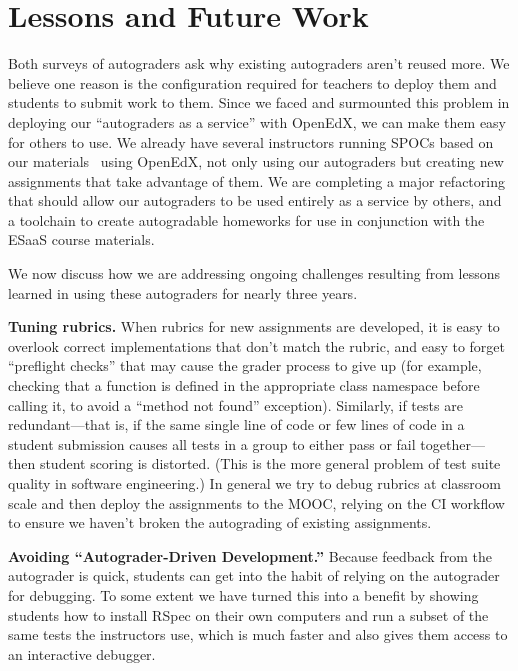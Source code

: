 \section{Lessons and Future Work}

Both  surveys of autograders ask why existing autograders aren't reused more.
We believe one reason is the configuration required for teachers to deploy them and
students to submit work to them.  Since we
faced and surmounted this problem in deploying our ``autograders as a
service'' with OpenEdX, we can make them easy for others to use.
We already have several instructors running SPOCs based on our
materials~\cite{moocs-spocs-TR} using OpenEdX, not only using our
autograders but creating new assignments that take advantage of them.
We are completing a major refactoring that should allow our autograders
to be used entirely as a service by others, and a toolchain to create
autogradable homeworks for use in conjunction with the ESaaS course
materials. 

We now discuss how we are addressing ongoing
challenges resulting from lessons learned in using these autograders for
nearly three years.

\textbf{Tuning rubrics.}
When rubrics for new assignments are developed, it is easy to overlook
correct implementations that don't match the rubric, and easy to forget
``preflight checks'' that may cause the grader process to give up (for
example, checking that a function is defined in the appropriate class
namespace before calling it, to avoid a ``method not found''
exception).  Similarly, if tests are
redundant---that is, if the same single line of code or few lines of
code in a student submission causes all tests in a group to either pass
or fail together---then student scoring is distorted.  (This is the more
general problem of test suite quality in software engineering.)
In general we try to debug rubrics at classroom scale and
then deploy the assignments to the MOOC, relying on the CI workflow to
ensure we haven't broken the autograding of existing assignments.

\textbf{Avoiding ``Autograder-Driven Development.''}
Because feedback from the autograder is quick, students can get into the
habit of relying on the autograder for debugging.  To some extent we
have turned this into a benefit by showing students how to install RSpec
on their own computers and run a subset of the same tests the
instructors use, which is much faster and also gives them access to an
interactive debugger.

